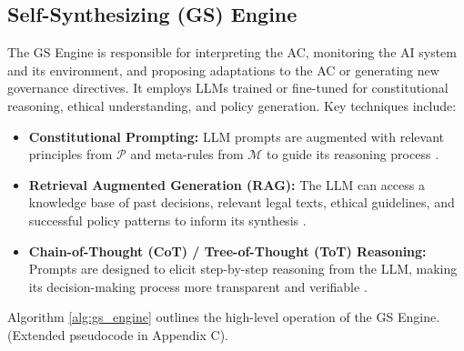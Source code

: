 \documentclass[sigconf,review,screen]{acmart}
\begin{document}
\subsection{Self-Synthesizing (GS) Engine}
The GS Engine is responsible for interpreting the AC, monitoring the AI system and its environment, and proposing adaptations to the AC or generating new governance directives.
It employs LLMs trained or fine-tuned for constitutional reasoning, ethical understanding, and policy generation. Key techniques include:
\begin{itemize}
    \item \textbf{Constitutional Prompting:} LLM prompts are augmented with relevant principles from $\mathcal{P}$ and meta-rules from $\mathcal{M}$ to guide its reasoning process \cite{bai2022constitutional}.
    \item \textbf{Retrieval Augmented Generation (RAG):} The LLM can access a knowledge base of past decisions, relevant legal texts, ethical guidelines, and successful policy patterns to inform its synthesis \cite{lewis2020retrieval}.
    \item \textbf{Chain-of-Thought (CoT) / Tree-of-Thought (ToT) Reasoning:} Prompts are designed to elicit step-by-step reasoning from the LLM, making its decision-making process more transparent and verifiable \cite{wei2022chain,yao2023tree}.
\end{itemize}
Algorithm \ref{alg:gs_engine} outlines the high-level operation of the GS Engine. (Extended pseudocode in Appendix C).
\end{document}
